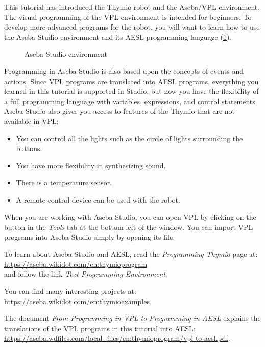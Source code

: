 
\label{ch.next}

This tutorial has introduced the Thymio robot and the Aseba/VPL
environment. The visual programming of the VPL environment is intended
for beginners. To develop more advanced programs for the robot, you will
want to learn how to use the Aseba Studio environment and its AESL
programming language (\cref{fig.studio}).

\begin{figure}[hbt]
\begin{center}
\caption{Aseba Studio environment}\label{fig.studio}
\end{center}
\end{figure}

Programming in Aseba Studio is also based upon the concepts of events
and actions. Since VPL programs are translated into AESL programs,
everything you learned in this tutorial is supported in Studio, but now
you have the flexibility of a full programming language with variables,
expressions, and control statements. Aseba Studio also gives you access
to features of the Thymio that are not available in VPL:

\begin{itemize}
\item You can control all the lights such as the circle of lights
surrounding the buttons.
\item You have more flexibility in synthesizing sound.
\item There is a temperature sensor.
\item A remote control device can be used with the robot.
\end{itemize}

When you are working with Aseba Studio, you can open VPL by clicking on
the button  in the \emph{Tools} tab at the bottom left of
the window. You can import VPL programs into Aseba Studio simply by
opening its file.

To learn about Aseba Studio and AESL, read the \emph{Programming Thymio} page at:\\
\url{https://aseba.wikidot.com/en:thymioprogram}\\
and follow the link \emph{Text Programming Environment}.

You can find many interesting projects at:\\ \url{https://aseba.wikidot.com/en:thymioexamples}.

The document \textit{From Programming in VPL to
Programming in AESL} explains the translations of the VPL programs in
 this tutorial into AESL:\\
\url{https://aseba.wdfiles.com/local--files/en:thymioprogram/vpl-to-aesl.pdf}.

\vspace{4em}


